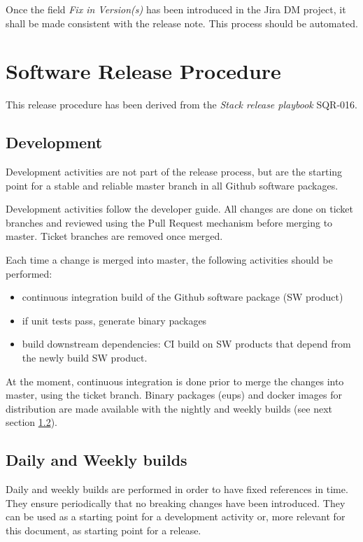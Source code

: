 Once the field \textit{Fix in Version(s)} has been introduced in the Jira DM project, it shall be made consistent with the release note. This process should be automated.


\newpage
\section{Software Release Procedure} \label{sect:releaseprocedure}

This release procedure has been derived from the \textit{Stack release playbook} SQR-016.

\subsection{Development} \label{sect:dev}

Development activities are not part of the release process, but are the starting point for a stable and reliable master branch in all Github software packages.

Development activities follow the \citep{DevGuide} developer guide. All changes are done on ticket branches and reviewed using the Pull Request mechanism before merging to master.
Ticket branches are removed once merged.

Each time a change is merged into master, the following activities should be performed:

\begin{itemize}
\item continuous integration build of the Github software package (SW product)
\item if unit tests pass, generate binary packages
\item build downstream dependencies: CI build on SW products that depend from the newly build SW product.
\end{itemize}

At the moment, continuous integration is done prior to merge the changes into master, using the ticket branch. Binary packages (eups) and docker images for distribution are made available with the nightly and weekly builds (see next section \ref{sect:weekly}).


\subsection{Daily and Weekly builds} \label{sect:weekly}

Daily and weekly builds are performed in order to have fixed references in time.
They ensure periodically that no breaking changes have been introduced.
They can be used as a starting point for a development activity or, more relevant for this document, as starting point for a release.

